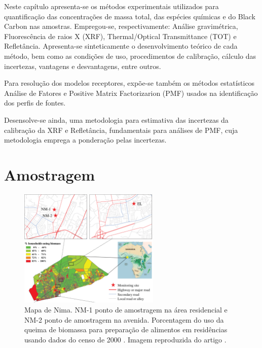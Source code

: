 Neste capítulo apresenta-se os métodos experimentais utilizados para 
quantificação das concentrações de massa total, das espécies químicas e 
do Black Carbon nas amostras. Empregou-se, respectivamente:
Análise gravimétrica, Fluorescência de raios X (XRF),
Thermal/Optical Transmittance (TOT) e Refletância.
Apresenta-se sinteticamente o desenvolvimento teórico de cada método, bem como 
as condições de uso, procedimentos de calibração, cálculo das incertezas, 
vantagens e desvantagens, entre outros.

Para resolução dos modelos receptores, expõe-se também os métodos 
estatísticos Análise de Fatores e Positive Matrix Factorizarion (PMF) 
usados na identificação dos perfis de fontes. 

Desensolve-se ainda, uma metodologia para estimativa das incertezas
da calibração da XRF e Refletância, fundamentais para análises de PMF,
cuja metodologia emprega a ponderação pelas incertezas.

\section{Amostragem}

\begin{figure}[H]
\begin{center}
  \includegraphics[width=0.6\textwidth]{../inputs/images/zheng/nima_mapa.pdf}
  \caption{Mapa de Nima. NM-1 ponto de amostragem na área residencial e 
           NM-2 ponto de amostragem na avenida. Porcentagem do uso da queima
           de biomassa para preparação de alimentos em residências usando dados
           do censo de 2000 \citep{ghanacensus2003}. Imagem reproduzida do 
           artigo \citet{zhou2013}. \label{fig:nima_mapa}}
\end{center}
\end{figure}

